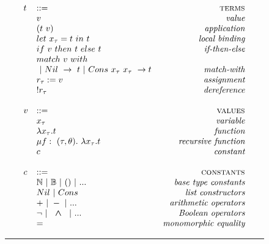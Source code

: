 \documentclass[a4paper,11pt,oneside]{article}
\theoremstyle{plain}
\newcommand{\bwedge}{\boldsymbol{~\wedge~}}
\begin{document}
\begin{figure}[H]
\begin{adjustwidth}{0em}{-3em}
\begin{footnotesize}
\begin{minipage}[t]{0.49\linewidth}
\begin{displaymath}
\begin{array}{llr}
\end{array}
\end{displaymath}
\end{minipage} 
\hspace*{0.7	em} \vrule \hfill 
\begin{minipage}[t]{0.49\linewidth}
\begin{displaymath}
\begin{array}{llr}
	t & ::=										& \textsc{terms}   \\
  	& v 										& \textit {value} \\
  	& (t~v) 								& \textit {application} \\
  	& let~x_{\tau} = t~in~t & \textit {local binding} \\
  	& if~v~then~t~else~t 		& \textit{if-then-else} \\
  	& match~v~with \\
  	& ~|~Nil~->~t~|~Cons~x_{\tau}~x_{\tau}~->t~ 
  													& \textit{match-with}\\
  	& r_{\tau} := v 				& \textit{assignment} \\
  	& !r_{\tau} 						& \textit {dereference} \\
	\\
	v & ::= 											& \textsc{values} \\
  	& x_{\tau}						  		& \textit {variable} \\
		& \lambda x_{\tau} . t 		  & \textit{function} \\
		& \mu f:~(\tau, \theta).~
			\lambda x_{\tau}. t				& \textit{recursive function} \\
		& c													& \textit{constant}  \\
	\\
  c & ::= 								& \textsc{constants} \\
  	& \mathbb{N}~|~\mathbb{B}~|~() ~|~ ... 
  												& \textit{base type constants} \\
  	& Nil ~|~ Cons   
  												& \textit {list constructors}  \\ 
  	& + ~|~ - ~|~ ... 		
  												& \textit{arithmetic operators} \\
  	& \neg ~|~ \bwedge ~|~ ... 
  												& \textit{Boolean operators} \\
 		& = 
 													& \textit{monomorphic equality} \\
\end{array}
\end{displaymath}
\end{minipage} 	 		 
\end{footnotesize}
\end{adjustwidth}
\label{mini-ml-def-syn}
\hrule
\end{figure} 
\end{document}
